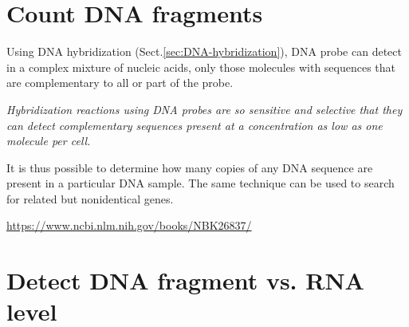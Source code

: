 \section{Count DNA fragments}

Using DNA hybridization (Sect.\ref{sec:DNA-hybridization}), DNA probe can detect
in a complex mixture of nucleic acids, only those molecules with sequences that
are complementary to all or part of the probe.

{\it Hybridization reactions using DNA probes are so sensitive and selective
that they can detect complementary sequences present at a concentration as low as one
molecule per cell.}

It is thus possible to determine how many copies of any DNA sequence are
present in a particular DNA sample. The same technique can be used to search
for related but nonidentical genes. 
 
\url{https://www.ncbi.nlm.nih.gov/books/NBK26837/}

  

\section{Detect DNA fragment vs. RNA level}

